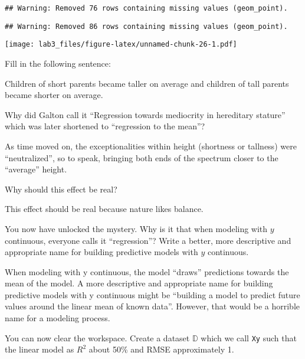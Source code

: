 \documentclass[
]{article}
\newenvironment{Shaded}{\begin{snugshade}}{\end{snugshade}}
\newcommand{\AttributeTok}[1]{\textcolor[rgb]{0.77,0.63,0.00}{#1}}
\newcommand{\DecValTok}[1]{\textcolor[rgb]{0.00,0.00,0.81}{#1}}
\newcommand{\FunctionTok}[1]{\textcolor[rgb]{0.00,0.00,0.00}{#1}}
\newcommand{\NormalTok}[1]{#1}
\newcommand{\OtherTok}[1]{\textcolor[rgb]{0.56,0.35,0.01}{#1}}
\newcommand{\SpecialCharTok}[1]{\textcolor[rgb]{0.00,0.00,0.00}{#1}}
\begin{document}
\begin{verbatim}
## Warning: Removed 76 rows containing missing values (geom_point).
\end{verbatim}

\begin{verbatim}
## Warning: Removed 86 rows containing missing values (geom_point).
\end{verbatim}

\texttt{[image: lab3\_files/figure-latex/unnamed-chunk-26-1.pdf]}

Fill in the following sentence:

Children of short parents became taller on average and children of tall
parents became shorter on average.

Why did Galton call it ``Regression towards mediocrity in hereditary
stature'' which was later shortened to ``regression to the mean''?

As time moved on, the exceptionalities within height (shortness or
tallness) were ``neutralized'', so to speak, bringing both ends of the
spectrum closer to the ``average'' height.

Why should this effect be real?

This effect should be real because nature likes balance.

You now have unlocked the mystery. Why is it that when modeling with
\(y\) continuous, everyone calls it ``regression''? Write a better, more
descriptive and appropriate name for building predictive models with
\(y\) continuous.

When modeling with y continuous, the model ``draws'' predictions towards
the mean of the model. A more descriptive and appropriate name for
building predictive models with y continuous might be ``building a model
to predict future values around the linear mean of known data''.
However, that would be a horrible name for a modeling process.

You can now clear the workspace. Create a dataset \(\mathbb{D}\) which
we call \texttt{Xy} such that the linear model as \(R^2\) about 50\% and
RMSE approximately 1.

\begin{Shaded}
\end{Shaded}
\end{document}
